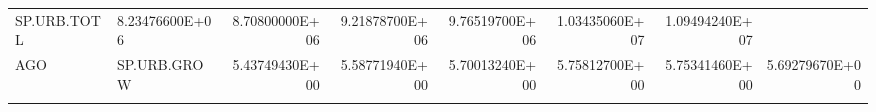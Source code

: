 \documentclass[]{article}
\begin{document}
\begin{longtable}[]{@{}llrrrrrr@{}}
\begin{minipage}[t]{0.08\columnwidth}
SP.URB.TOTL\strut
\end{minipage} & \begin{minipage}[t]{0.11\columnwidth}\raggedleft\strut
8.23476600E+06\strut
\end{minipage} & \begin{minipage}[t]{0.11\columnwidth}\raggedleft\strut
8.70800000E+06\strut
\end{minipage} & \begin{minipage}[t]{0.11\columnwidth}\raggedleft\strut
9.21878700E+06\strut
\end{minipage} & \begin{minipage}[t]{0.11\columnwidth}\raggedleft\strut
9.76519700E+06\strut
\end{minipage} & \begin{minipage}[t]{0.11\columnwidth}\raggedleft\strut
1.03435060E+07\strut
\end{minipage} & \begin{minipage}[t]{0.11\columnwidth}\raggedleft\strut
1.09494240E+07\strut
\end{minipage}\tabularnewline
\begin{minipage}[t]{0.06\columnwidth}\raggedright\strut
AGO\strut
\end{minipage} & \begin{minipage}[t]{0.08\columnwidth}\raggedright\strut
SP.URB.GROW\strut
\end{minipage} & \begin{minipage}[t]{0.11\columnwidth}\raggedleft\strut
5.43749430E+00\strut
\end{minipage} & \begin{minipage}[t]{0.11\columnwidth}\raggedleft\strut
5.58771940E+00\strut
\end{minipage} & \begin{minipage}[t]{0.11\columnwidth}\raggedleft\strut
5.70013240E+00\strut
\end{minipage} & \begin{minipage}[t]{0.11\columnwidth}\raggedleft\strut
5.75812700E+00\strut
\end{minipage} & \begin{minipage}[t]{0.11\columnwidth}\raggedleft\strut
5.75341460E+00\strut
\end{minipage} & \begin{minipage}[t]{0.11\columnwidth}\raggedleft\strut
5.69279670E+00\strut
\end{minipage}\tabularnewline
\begin{minipage}[t]{0.06\columnwidth}\raggedright\strut

\end{minipage}
\end{longtable}
\end{document}
